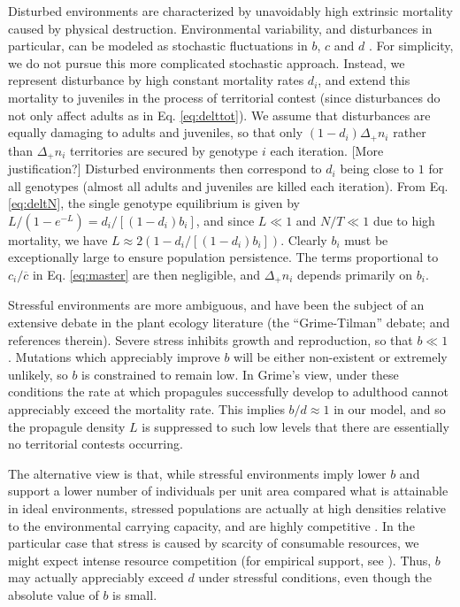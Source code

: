 \documentclass[11pt]{article}
\begin{document}
Disturbed environments are characterized by unavoidably high extrinsic mortality caused by physical destruction. Environmental variability, and disturbances in particular, can be modeled as stochastic fluctuations in $b$, $c$ and $d$ \citep{chesson_1981}. For simplicity, we do not pursue this more complicated stochastic approach. Instead, we represent disturbance by high constant mortality rates $d_i$, and extend this mortality to juveniles in the process of territorial contest (since disturbances do not only affect adults as in Eq. \eqref{eq:delttot}). We assume that disturbances are equally damaging to adults and juveniles, so that only $(1-d_i)\Delta_+ n_i$ rather than $\Delta_+ n_i$ territories are secured by genotype $i$ each iteration. [More justification?] Disturbed environments then correspond to $d_i$ being close to $1$ for all genotypes (almost all adults and juveniles are killed each iteration). From Eq. \eqref{eq:deltN}, the single genotype equilibrium is given by $L/(1-e^{-L})=d_i/[(1-d_i)b_i]$, and since $L\ll 1$ and $N/T\ll 1$ due to high mortality, we have $L\approx 2(1-d_i/[(1-d_i)b_i])$. Clearly $b_i$ must be exceptionally large to ensure population persistence. The terms proportional to $c_i/\overline{c}$ in Eq. \eqref{eq:master} are then negligible, and $\Delta_+ n_i$ depends primarily on $b_i$. 

Stressful environments are more ambiguous, and have been the subject of an extensive debate in the plant ecology literature (the ``Grime-Tilman'' debate; \citealt{aerts_1999} and references therein). Severe stress inhibits growth and reproduction, so that $b\ll 1$ \citep{grime_1974,grime_1977}. Mutations which appreciably improve $b$ will be either non-existent or extremely unlikely, so $b$ is constrained to remain low. In Grime's view, under these conditions the rate at which propagules successfully develop to adulthood cannot appreciably exceed the mortality rate. This implies $b/d\approx 1$ in our model, and so the propagule density $L$ is suppressed to such low levels that there are essentially no territorial contests occurring. 

The alternative view is that, while stressful environments imply lower $b$ and support a lower number of individuals per unit area compared what is attainable in ideal environments, stressed populations are actually at high densities relative to the environmental carrying capacity, and are highly competitive \citep{taylor_1990}. In the particular case that stress is caused by scarcity of consumable resources, we might expect intense resource competition (for empirical support, see \citealt{davis_1998}). Thus, $b$ may actually appreciably exceed $d$ under stressful conditions, even though the absolute value of $b$ is small. 
\end{document}
